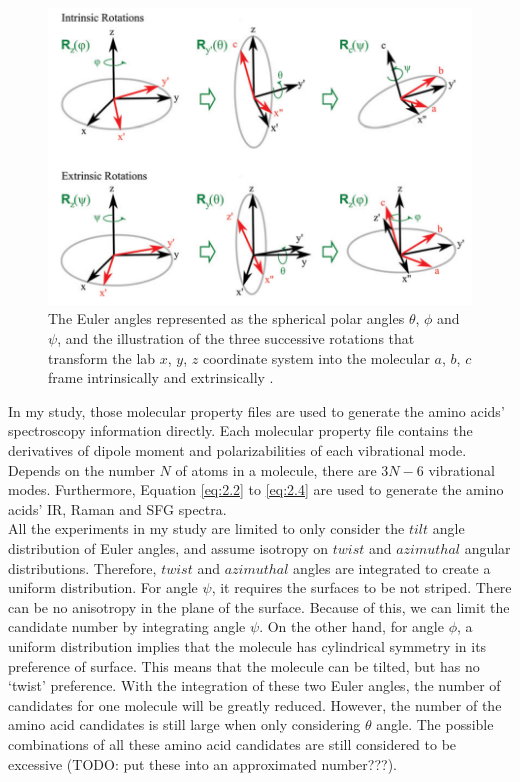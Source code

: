 \begin{figure}[!ht] 
\centering
\includegraphics[scale=0.5]{Figures/Euler_angles_represented_as_the_spherical_polar_angles.png} 
\caption{The Euler angles represented as the spherical polar angles $\theta$, $\phi$ and $\psi$, and the illustration of the three successive rotations that transform the lab $x$, $y$, $z$ coordinate system into the molecular $a$, $b$, $c$ frame intrinsically and extrinsically \cite{hore0033-rotations}. }
\label{fig:2.1}
\end{figure}

In my study, those molecular property files are used to generate the amino acids' spectroscopy information directly. Each molecular property file contains the derivatives of dipole moment and polarizabilities of each vibrational mode. Depends on the number $N$ of atoms in a molecule, there are $3N-6$ vibrational modes. Furthermore, Equation \ref{eq:2.2} to \ref{eq:2.4} are used to generate the amino acids' IR, Raman and SFG spectra. \\

All the experiments in my study are limited to only consider the $tilt$ angle distribution of Euler angles, and assume isotropy on $twist$ and $azimuthal$ angular distributions. Therefore, $twist$ and $azimuthal$ angles are integrated to create a uniform distribution. For angle $\psi$, it requires the surfaces to be not striped. There can be no anisotropy in the plane of the surface. Because of this, we can limit the candidate number by integrating angle $\psi$. On the other hand, for angle $\phi$, a uniform distribution implies that the molecule has cylindrical symmetry in its preference of surface. This means that the molecule can be tilted, but has no `twist' preference. With the integration of these two Euler angles, the number of candidates for one molecule will be greatly reduced. However, the number of the amino acid candidates is still large when only considering $\theta$ angle. The possible combinations of all these amino acid candidates are still considered to be excessive (TODO: put these into an approximated number???). \\

